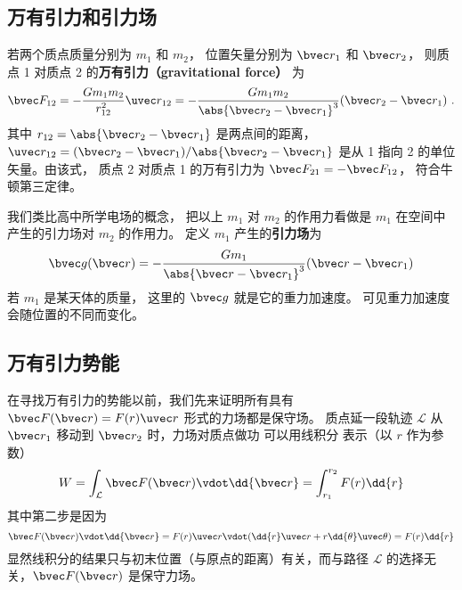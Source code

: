

\subsection{万有引力和引力场}

若两个质点质量分别为 $m_1$ 和 $m_2$， 位置矢量分别为 $\bvec r_1$ 和 $\bvec r_2$， 则质点 1 对质点 2 的\textbf{万有引力（gravitational force）} 为
\begin{equation}\label{Gravty_eq1}
\bvec F_{12} =  - \frac{G m_1 m_2}{r_{12}^2} \uvec r_{12} = - \frac{G m_1 m_2}{\abs{\bvec r_2 - \bvec r_1}^3}(\bvec r_2 - \bvec r_1)~.
\end{equation}
其中 $r_{12} = \abs{\bvec r_2 - \bvec r_1}$ 是两点间的距离，$\uvec r_{12} = (\bvec r_2 - \bvec r_1)/\abs{\bvec r_2 - \bvec r_1}$ 是从 1 指向 2 的单位矢量。由该式， 质点 2 对质点 1 的万有引力为 $\bvec F_{21} = -\bvec F_{12}$， 符合牛顿第三定律。

我们类比高中所学电场的概念， 把以上 $m_1$ 对 $m_2$ 的作用力看做是 $m_1$ 在空间中产生的引力场对 $m_2$ 的作用力。 定义 $m_1$ 产生的\textbf{引力场}为
\begin{equation}\label{Gravty_eq2}
\bvec g(\bvec r) = -\frac{Gm_1}{\abs{\bvec r - \bvec r_1} ^3}(\bvec r - \bvec r_1)
\end{equation}
若 $m_1$ 是某天体的质量， 这里的 $\bvec g$ 就是它的重力加速度。 可见重力加速度会随位置的不同而变化。

\subsection{万有引力势能}

在寻找万有引力的势能以前，我们先来证明所有具有 $\bvec F(\bvec r) = F(r) \uvec r$ 形式的力场都是保守场。 质点延一段轨迹 $\mathcal{L}$ 从 $\bvec r_1$ 移动到 $\bvec r_2$ 时，力场对质点做功 可以用线积分 表示（以 $r$ 作为参数）
\begin{equation}\label{Gravty_eq3}
W = \int_\mathcal{L} \bvec F(\bvec r) \vdot \dd{\bvec r} = \int_{r_1}^{r_2} F(r) \dd{r}
\end{equation}
其中第二步是因为
\begin{equation}
\bvec F(\bvec r) \vdot \dd{\bvec r} = F(r)\uvec  r \vdot (\dd{r} \uvec  r + r\dd{\theta} \uvec \theta ) = F(r) \dd{r}
\end{equation}
显然线积分的结果只与初末位置（与原点的距离）有关，而与路径 $\mathcal{L}$ 的选择无关，$\bvec F(\bvec r)$ 是保守力场。

